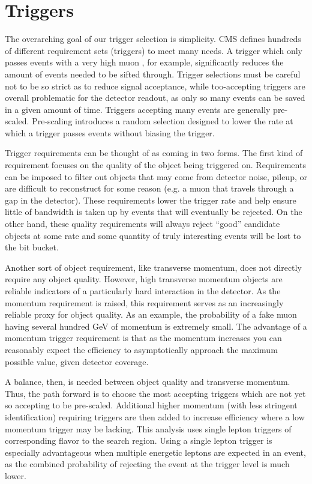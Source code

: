 \section{Triggers}
\label{sec:triggers}
The overarching goal of our trigger selection is simplicity. CMS defines hundreds of different requirement sets (triggers) to meet many needs. A trigger which only passes events with a very high muon \pt, for example, significantly reduces the amount of events needed to be sifted through.  Trigger selections must be careful not to be so strict as to reduce signal acceptance, while too-accepting triggers are overall problematic for the detector readout, as only so many events can be saved in a given amount of time.  Triggers accepting many events are generally pre-scaled.  Pre-scaling introduces a random selection designed to lower the rate at which a trigger passes events without biasing the trigger.

Trigger requirements can be thought of as coming in two forms. The first kind of requirement focuses on the quality of the object being triggered on. Requirements can be imposed to filter out objects that may come from detector noise, pileup, or are difficult to reconstruct for some reason (e.g. a muon that travels through a gap in the detector). These requirements lower the trigger rate and help ensure little of \CMS bandwidth is taken up by events that will eventually be rejected. On the other hand, these quality requirements will always reject ``good'' candidate objects at some rate and some quantity of truly interesting events will be lost to the bit bucket. 

Another sort of object requirement, like transverse momentum, does not directly require any object quality. However, high transverse momentum objects are reliable indicators of a particularly hard interaction in the detector. As the momentum requirement is raised, this requirement serves as an increasingly reliable proxy for object quality. As an example, the probability of a fake muon having several hundred GeV of momentum is extremely small. The advantage of a momentum trigger requirement is that as the momentum increases you can reasonably expect the efficiency to asymptotically approach the maximum possible value, given detector coverage.

A balance, then, is needed between object quality and transverse momentum. Thus, the path forward is to choose the most accepting triggers which are not yet so accepting to be pre-scaled.  Additional higher momentum (with less stringent identification) requiring triggers are then added to increase efficiency where a low momentum trigger may be lacking. This analysis uses single lepton triggers of corresponding flavor to the search region. Using a single lepton trigger is especially advantageous when multiple energetic leptons are expected in an event, as the combined probability of rejecting the event at the trigger level is much lower.
